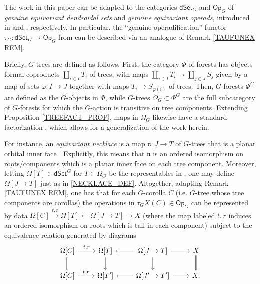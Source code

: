 \documentclass{hha}
\theoremstyle{definition} %
\newcommand{\Op}{\mathsf{Op}}
\newcommand{\dSet}{\mathsf{dSet}}
\begin{document}
\begin{remark}\label{GTAUFUNEX REM}
	The work in this paper can be adapted to the categories
	$\mathsf{dSet}_G$ and $\mathsf{Op}_G$
	of \textit{genuine equivariant dendroidal sets} and \textit{genuine equivariant operads},
	introduced in \cite[\S 5.4]{Per18} and \cite{BP_geo}, respectively.
%	
	In particular, 
	the ``genuine operadification'' functor
	$\tau_G \colon \mathsf{dSet}_G \to \mathsf{Op}_G$
	from
	\cite[Eq. (2.42)]{BP_TAS}
	can be described via an analogue of
	Remark \ref{TAUFUNEX REM}.

Briefly, $G$-trees are defined as follows. 
First, the category $\Phi$ of forests has objects
formal coproducts $\amalg_{i\in I} T_i$ of trees,
with maps $\amalg_{i\in I} T_i \to \amalg_{j\in J} S_j$
given by a map of sets $\varphi \colon I \to J$ together with maps
$T_i \to S_{\varphi (i)}$ of trees.
Then, $G$-forests $\Phi^G$ are defined as the $G$-objects in $\Phi$,
while $G$-trees $\Omega_G \subset \Phi^G$
are the full subcategory of $G$-forests for which
the $G$-action is transitive on tree components.
Extending Proposition \ref{TREEFACT_PROP},
maps in $\Omega_G$ likewise have a standard factorization
\cite[Cor. 2.27]{BP_TAS},
which allows for a generalization of the work herein.

For instance, an \emph{equivariant necklace}
is a map $\mathfrak{n} \colon J \to T$ of $G$-trees
that is a planar orbital inner face 
\cite[Def. A.3]{BP_TAS}.
Explicitly, this means that $\mathfrak{n}$
is an ordered isomorphism on roots/components which is a planar inner face on each tree component.
Moreover, letting $\Omega[T] \in \dSet^G$ for $T \in \Omega_G$
 be the representables 
in \cite[\S 2.3]{BP_TAS},
one may define $\Omega[J \to T]$ just as in 
\eqref{NECKLACE_DEF}.
Altogether, adapting Remark \ref{TAUFUNEX REM},
one has that for each $G$-corolla $C$ (i.e. $G$-tree whose tree components are corollas)
the operations in 
$\tau_G X(C) \in \Op_G$
can be represented by data
$\Omega[C] \xrightarrow{t,r}
\Omega[T] \leftarrow
\Omega[J \to T] \to 
X$
(where the map labeled $t,r$ induces an ordered isomorphism on roots which is tall in each component)
subject to the equivalence relation generated by diagrams
\[
\begin{tikzcd}
\Omega[C] \ar{r}{t,r} \ar[equal]{d} &
\Omega[T] \ar{d} &
\Omega[J \to T] \ar{l} \ar{r} \ar{d} &
X \ar[equal]{d}
\\
\Omega[C] \ar{r}{t,r} &
\Omega[T'] &
\Omega[J' \to T'] \ar{l} \ar{r} &
X.
\end{tikzcd}
\]
\end{remark}
\end{document}
